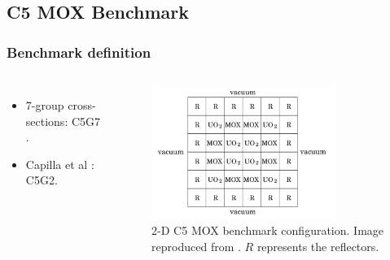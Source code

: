 \subsection{C5 MOX Benchmark}
\begin{frame}
\frametitle{Benchmark definition}

\begin{columns}
    \column[t]{4cm}
    \begin{itemize}
        \item 7-group cross-sections: C5G7 \cite{oecdnea_benchmark_2003}.
        \item Capilla et al \cite{capilla_applications_2009}: C5G2.
    \end{itemize}

    \column[t]{6cm}
    \begin{figure}[htbp!]
        \begin{center}
            \includegraphics[width=6cm]{figures/bench-config}
        \end{center}
        \caption{2-D C5 MOX benchmark configuration. Image reproduced from \cite{capilla_applications_2009}. $R$ represents the reflectors.}
    \end{figure}
\end{columns}
\end{frame}


